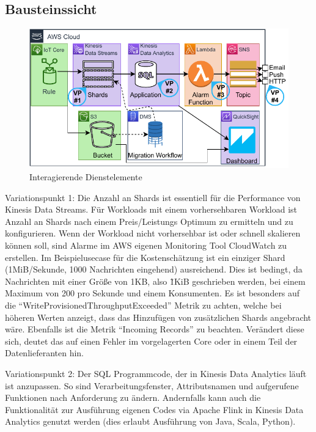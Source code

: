 \subsection{Bausteinssicht}
\begin{figure}[H]
\centering
\includegraphics[width=\textwidth]{graphics/Echtzeit-RA-Elements.pdf}
\caption{Interagierende Dienstelemente}
\label{abb:ElementeEchtzeitRA}
\end{figure}
Variationspunkt 1: Die Anzahl an Shards ist essentiell für die Performance von Kinesis Data Streams. Für Workloads mit einem vorhersehbaren Workload ist Anzahl an Shards nach einem Preis/Leistungs Optimum zu ermitteln und zu konfigurieren. Wenn der Workload nicht vorhersehbar ist oder schnell skalieren können soll, sind Alarme im AWS eigenen Monitoring Tool CloudWatch zu erstellen. Im Beispielusecase für die Kostenschätzung ist ein einziger Shard (1MiB/Sekunde, 1000 Nachrichten eingehend) ausreichend. Dies ist bedingt, da Nachrichten mit einer Größe von 1KB, also \~1KiB geschrieben werden, bei einem Maximum von 200 pro Sekunde und einem Konsumenten. Es ist besonders auf die \enquote{WriteProvisionedThroughputExceeded} Metrik zu achten, welche bei höheren Werten anzeigt, dass das Hinzufügen von zusätzlichen Shards angebracht wäre. Ebenfalls ist die Metrik \enquote{Incoming Records} zu beachten. Verändert diese sich, deutet das auf einen Fehler im vorgelagerten \AWSIOT{} Core oder in einem Teil der Datenlieferanten hin.


Variationspunkt 2: Der \ac{SQL} Programmcode, der in Kinesis Data Analytics läuft ist anzupassen. So sind Verarbeitungsfenster, Attributsnamen und aufgerufene Funktionen nach Anforderung zu ändern. Andernfalls kann auch die Funktionalität zur Ausführung eigenen Codes via Apache Flink in Kinesis Data Analytics genutzt werden (dies erlaubt Ausführung von Java, Scala, Python).

